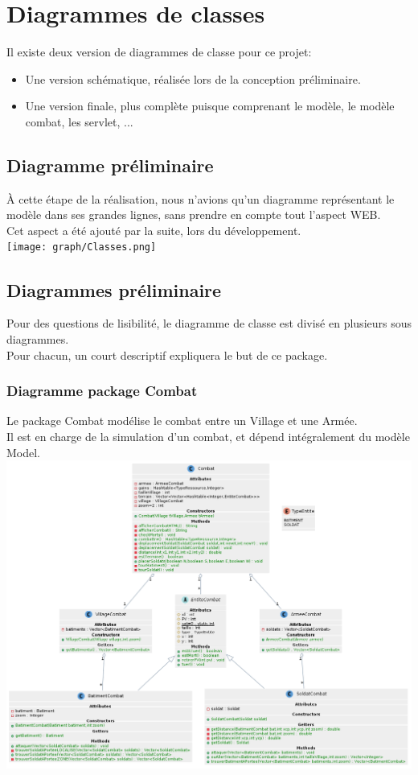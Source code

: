 \chapter{Diagrammes de classes}
    Il existe deux version de diagrammes de classe pour ce projet:
    \begin{itemize}
        \item Une version schématique, réalisée lors de la conception préliminaire.
        \item Une version finale, plus complète puisque comprenant le modèle, le modèle combat, les servlet, ...
    \end{itemize}
    \section{Diagramme préliminaire}
        À cette étape de la réalisation, nous n'avions qu'un diagramme représentant le modèle dans ses grandes lignes, sans prendre en compte tout l'aspect WEB.\\
        Cet aspect a été ajouté par la suite, lors du développement.\\

        \texttt{[image: graph/Classes.png]}
    \section{Diagrammes préliminaire}
        Pour des questions de lisibilité, le diagramme de classe est divisé en plusieurs sous diagrammes.\\
        Pour chacun, un court descriptif expliquera le but de ce package.
        \subsection{Diagramme package Combat}
            Le package Combat modélise le combat entre un Village et une Armée.\\
            Il est en charge de la simulation d'un combat, et dépend intégralement du modèle Model.\\

            \includegraphics[scale=0.4]{ressources/images/ClassesCombat.png}
